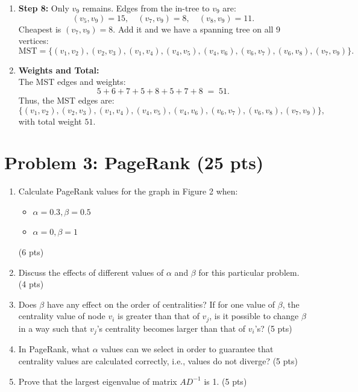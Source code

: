\documentclass[a4paper,12pt]{article}
\begin{document}
\begin{enumerate}
\begin{enumerate}
    \item \textbf{Step 8:} Only \(v_9\) remains. Edges from the in-tree to \(v_9\) are:
    \[
    (v_5,v_9)=15,\quad (v_7,v_9)=8,\quad (v_8,v_9)=11.
    \]
    Cheapest is \((v_7,v_9)=8\).  Add it and we have a spanning tree on all 9 vertices:
    \[
    \text{MST} = \bigl\{
    (v_1,v_2), (v_2,v_3), (v_1,v_4), (v_4,v_5), (v_4,v_6), (v_6,v_7),
    (v_6,v_8), (v_7,v_9)
    \bigr\}.
    \]

    \item \textbf{Weights and Total:}\\[3pt]
    The MST edges and weights:
    \[
    5 + 6 + 7 + 5 + 8 + 5 + 7 + 8 \;=\; 51.
    \]
    Thus, the MST edges are:
    \[
    \{(v_1,v_2),(v_2,v_3),(v_1,v_4),(v_4,v_5),(v_4,v_6),(v_6,v_7),(v_6,v_8),(v_7,v_9)\},
    \]
    with total weight \(51\).
    \end{enumerate}
    \end{enumerate}




\section{Problem 3: PageRank (25 pts)}

\begin{enumerate}
    \item Calculate PageRank values for the graph in Figure 2 when:
    \begin{itemize}
        \item \( \alpha = 0.3, \beta = 0.5 \)
        \item \( \alpha = 0, \beta = 1 \)
    \end{itemize} (6 pts)
    \item Discuss the effects of different values of \( \alpha \) and \( \beta \) for this particular problem. (4 pts)
    \item Does \( \beta \) have any effect on the order of centralities? If for one value of \( \beta \), the centrality value of node \( v_i \) is greater than that of \( v_j \), is it possible to change \( \beta \) in a way such that \( v_j \)'s centrality becomes larger than that of \( v_i \)'s? (5 pts)
    \item In PageRank, what \( \alpha \) values can we select in order to guarantee that centrality values are calculated correctly, i.e., values do not diverge? (5 pts)
    \item Prove that the largest eigenvalue of matrix \( AD^{-1} \) is 1. (5 pts)
\end{enumerate}
\end{document}
